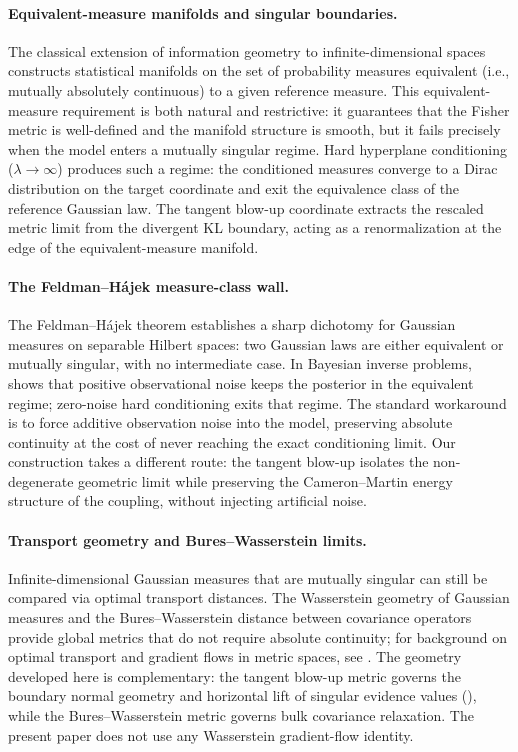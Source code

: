 \documentclass[11pt]{amsart}
\theoremstyle{plain}
\theoremstyle{definition}
\theoremstyle{remark}
\begin{document}
\paragraph{Equivalent-measure manifolds and singular boundaries.}
The classical extension of information geometry to infinite-dimensional spaces \cite{amari2000methods,pistone1995infinite,newton2012infinite} constructs statistical manifolds on the set of probability measures equivalent (i.e., mutually absolutely continuous) to a given reference measure. This equivalent-measure requirement is both natural and restrictive: it guarantees that the Fisher metric is well-defined and the manifold structure is smooth, but it fails precisely when the model enters a mutually singular regime. Hard hyperplane conditioning ($\lambda \to \infty$) produces such a regime: the conditioned measures converge to a Dirac distribution on the target coordinate and exit the equivalence class of the reference Gaussian law. The tangent blow-up coordinate extracts the rescaled metric limit from the divergent KL boundary, acting as a renormalization at the edge of the equivalent-measure manifold.

\paragraph{The Feldman--H\'{a}jek measure-class wall.}
The Feldman--H\'{a}jek theorem \cite{feldman1958equivalence,hajek1958property,bogachev1998gaussian} establishes a sharp dichotomy for Gaussian measures on separable Hilbert spaces: two Gaussian laws are either equivalent or mutually singular, with no intermediate case. In Bayesian inverse problems, \cite{stuart2010inverse} shows that positive observational noise keeps the posterior in the equivalent regime; zero-noise hard conditioning exits that regime. The standard workaround is to force additive observation noise into the model, preserving absolute continuity at the cost of never reaching the exact conditioning limit. Our construction takes a different route: the tangent blow-up isolates the non-degenerate geometric limit while preserving the Cameron--Martin energy structure of the coupling, without injecting artificial noise.

\paragraph{Transport geometry and Bures--Wasserstein limits.}
Infinite-dimensional Gaussian measures that are mutually singular can still be compared via optimal transport distances. The Wasserstein geometry of Gaussian measures \cite{takatsu2011wasserstein} and the Bures--Wasserstein distance between covariance operators \cite{bhatia2019bures} provide global metrics that do not require absolute continuity; for background on optimal transport and gradient flows in metric spaces, see \cite{villani2009optimal}. The geometry developed here is complementary: the tangent blow-up metric governs the boundary normal geometry and horizontal lift of singular evidence values (), while the Bures--Wasserstein metric governs bulk covariance relaxation. The present paper does not use any Wasserstein gradient-flow identity.
\end{document}
